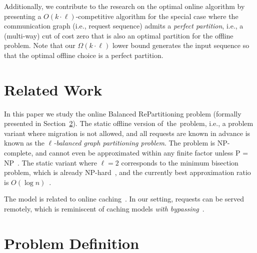 \documentclass[manuscript,screen=true]{acmart}
\newcommand\mahmoud[1]{\color{green}\textbf{\\ Mahmoud: #1}\\\color{black}}
\newcommand\maciek[1]{\color{brown}\textbf{\\ Maciek: #1}\color{black}}
\begin{document}
Additionally, we contribute to the research on the optimal online algorithm by presenting a $O(k\cdot \ell)$-competitive algorithm for the special case
where the communication graph (i.e., request sequence) admits a \emph{perfect partition},
i.e., a (multi-way) cut of cost zero that is also an optimal partition for the offline problem.
Note that our $\Omega(k\cdot \ell)$ lower bound generates the input sequence
so that the optimal offline choice is a perfect partition.

\section{Related Work}

In this paper we study the online Balanced RePartitioning problem (formally presented in Section~\ref{sec:problem-definition}).
The static offline version of~the~problem, i.e., a problem variant where
migration is not allowed, and all requests are known in advance is known as the
\emph{$\ell$-balanced graph partitioning problem}. The problem is 
NP-complete, and cannot even be approximated within any finite factor unless P
= NP~\cite{AndRae06}.  The static
variant where $\ell = 2$ corresponds to the minimum bisection problem, which
is already NP-hard~\cite{GaJoSt76}, and 
the currently best approximation ratio is $O(\log n)$~\cite{SarVaz95,ArKaKa99,FeKrNi00,FeiKra02,KraFei06,Raec08}.

The model is related to online
caching~\cite{SleTar85,FKLMSY91,McGSle91,AcChNo00}. In our
setting, requests can be served remotely, which is
reminiscent of caching models \emph{with
bypassing}~\cite{EpImLN11,EpImLN15,Irani02}.


\section{Problem Definition}
\label{sec:problem-definition}
\end{document}
